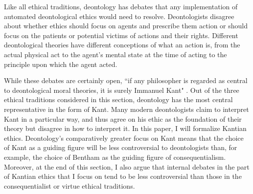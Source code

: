 \begin{isabellebody}
\begin{isamarkuptext}
Like all ethical traditions, deontology has debates that any implementation of automated deontological
ethics would need to resolve. Deontologists disagree about whether ethics should focus on agents and 
prescribe them action or should focus on the patients or potential victims of actions and their rights.
 Different deontological theories have different conceptions of what an action is, 
from the actual physical act to the agent's mental state at the time of acting to the principle upon
which the agent acted. 

While these debates are certainly open, ``if any philosopher is regarded as central
to deontological moral theories, it is surely Immanuel Kant" \citep{sepdeont}. Out of the three ethical
traditions considered in this section, deontology has the most central representative in the form of 
Kant. Many modern deontologists claim to interpret Kant in a particular way, and thus agree on 
his ethic as the foundation of their theory but disagree in how to interpret it. In this paper, I will 
formalize Kantian ethics. Deontology's comparatively greater focus on Kant means that the choice of 
Kant as a guiding figure will be less controversial to deontologists than, for example, the choice of Bentham
as the guiding figure of consequentialism. Moreover, at the end of this section, I also argue that 
internal debates in the part of Kantian ethics that I focus on tend to be less controversial than those
in the consequentialist or virtue ethical traditions.


\end{isamarkuptext}
\end{isabellebody}
